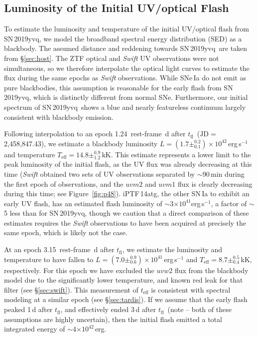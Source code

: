 \documentclass[twocolumn]{aastex63}
\newcommand{\tfl}{$t_\mathrm{fl}$}
\newcommand{\sn}{SN\,2019yvq}
\begin{document}
\subsection{Luminosity of the Initial UV/optical Flash}\label{sec:luminosity}

To estimate the luminosity and temperature of the initial UV/optical flash from
\sn, we model the broadband spectral energy distribution (SED) as a blackbody.
The assumed distance and reddening towards \sn\ are taken from
\S\ref{sec:host}. The ZTF optical and \textit{Swift} UV observations were not
simultaneous, so we therefore interpolate the optical light curves to estimate
the flux during the same epochs as \textit{Swift} observations. While SNe\,Ia
do not emit as pure blackbodies, this assumption is reasonable for the early
flash from \sn, which is distinctly different from normal SNe. Furthermore,
our initial spectrum of \sn\ shows a blue and nearly featureless continuum
largely consistent with blackbody emission.

Following interpolation to an epoch 1.24~rest-frame~d after \tfl\
($\mathrm{JD} = $2,458,847.43), we estimate a blackbody luminosity $L = (1.7
\pm ^{0.2}_{0.1}) \times 10^{42}$\,erg\,s$^{-1}$ and temperature
$T_\mathrm{eff} = 14.8 \pm^{0.9}_{1.2}$\,kK. This estimate represents a lower
limit to the peak luminosity of the initial flash, as the UV flux was already
decreasing at this time (\textit{Swift} obtained two sets of UV observations
separated by $\sim$90\,min during the first epoch of observations, and the
$uvm2$ and $uvm1$ flux is clearly decreasing during this time; see
Figure~\ref{fig:p48}). iPTF\,14atg, the other SN\,Ia to exhibit an early UV
flash, has an estimated flash luminosity of $\sim$3$ \times
10^{41}$erg\,s$^{-1}$, a factor of $\sim$5 less than for \sn, though we
caution that a direct comparison of these estimates requires the
\textit{Swift} observations to have been acquired at precisely the same epoch,
which is likely not the case.

At an epoch 3.15~rest-frame~d after \tfl, we estimate the luminosity and
temperature to have fallen to $L = (7.0 \pm ^{0.9}_{0.6}) \times
10^{41}$\,erg\,s$^{-1}$ and $T_\mathrm{eff} = 8.7 \pm^{0.5}_{0.4}$\,kK,
respectively. For this epoch we have excluded the $uvw2$ flux from the
blackbody model due to the significantly lower temperature, and known red leak
for that filter (see \S\ref{sec:swift}). This measurement of $t_\mathrm{eff}$
is consistent with spectral modeling at a similar epoch (see
\S\ref{sec:tardis}). If we assume that the early flash peaked 1\,d after \tfl,
and effectively ended 3\,d after \tfl\ (note -- both of these assumptions are
highly uncertain), then the initial flash emitted a total integrated energy of
$\sim$4$\times 10^{42}$\,erg.
\end{document}
